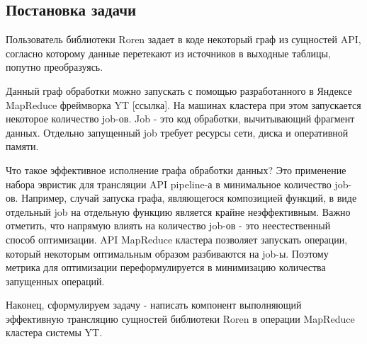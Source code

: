\subsection{Постановка задачи}

Пользователь библиотеки Roren задает в коде некоторый граф из сущностей API, согласно которому данные перетекают из источников в выходные таблицы, попутно преобразуясь.

Данный граф обработки можно запускать с помощью разработанного в Яндексе MapReduce фреймворка YT [ссылка]. На машинах кластера при этом запускается некоторое количество job-ов. Job - это код обработки, вычитывающий фрагмент данных. Отдельно запущенный job требует ресурсы сети, диска и оперативной памяти.

Что такое эффективное исполнение графа обработки данных? Это применение набора эвристик для трансляции API pipeline-а в  минимальное количество job-ов. Например, случай запуска графа, являющегося композицией функций, в виде отдельный job на отдельную функцию является крайне неэффективным. Важно отметить, что напрямую влиять на количество job-ов - это неестественный способ оптимизации. API MapReduce кластера позволяет запускать операции, который некоторым оптимальным образом разбиваются на job-ы.  Поэтому метрика для оптимизации переформулируется в минимизацию количества запущенных операций.

Наконец, сформулируем задачу - написать компонент выполняющий эффективную трансляцию сущностей библиотеки Roren в операции MapReduce кластера системы YT.
